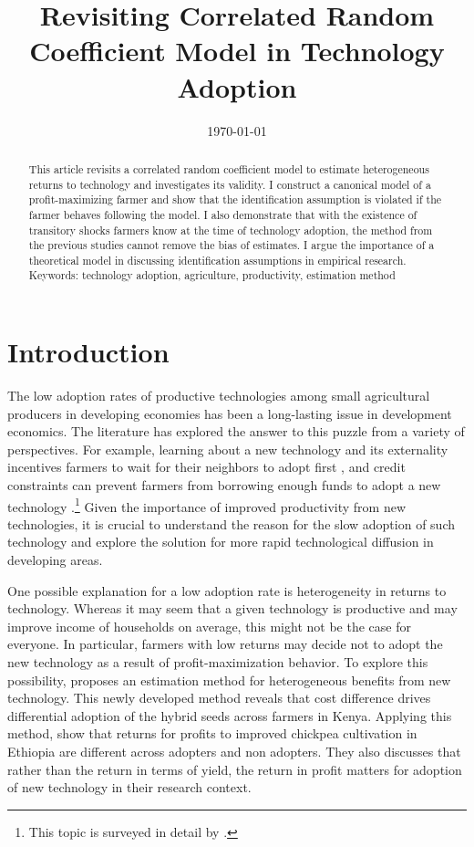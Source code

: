 \documentclass[11pt,letterpaper]{article}
\title{Revisiting Correlated Random Coefficient Model in Technology Adoption}
\author{}
\date{\today}
\begin{document}
  
\maketitle
\begin{abstract}
  \singlespacing
    \noindent 
    This article revisits a correlated random coefficient model to estimate heterogeneous returns to technology and investigates its validity.
    I construct a canonical model of a profit-maximizing farmer and show that the identification assumption is violated if the farmer behaves following the model. 
    I also demonstrate that with the existence of transitory shocks farmers know at the time of technology adoption, the method from the previous studies cannot remove the bias of estimates.
    I argue the importance of a theoretical model in discussing identification assumptions in empirical research. \\

  \medskip
  \noindent Keywords: technology adoption, agriculture, productivity, estimation method
\end{abstract}

\newpage

\section{Introduction}

The low adoption rates of productive technologies among small agricultural producers in developing economies has been a long-lasting issue in development economics. 
The literature has explored the answer to this puzzle from a variety of perspectives.
For example, learning about a new technology and its externality incentives farmers to wait for their neighbors to adopt first \citep{foster1995learning, conley2010learning}, and credit constraints can prevent farmers from borrowing enough funds to adopt a new technology \citep{gine2006credit}.\footnote{
  This topic is surveyed in detail by \citet{foster2010microeconomics}.
}
Given the importance of improved productivity from new technologies, it is crucial to understand the reason for the slow adoption of such technology and explore the solution for more rapid technological diffusion in developing areas.

One possible explanation for a low adoption rate is heterogeneity in returns to technology.
Whereas it may seem that a given technology is productive and may improve income of households on average, this might not be the case for everyone.
In particular, farmers with low returns may decide not to adopt the new technology as a result of profit-maximization behavior.
To explore this possibility, \citet{Suri11} proposes an estimation method for heterogeneous benefits from new technology.
This newly developed method reveals that cost difference drives differential adoption of the hybrid seeds across farmers in Kenya.
Applying this method, \citet{Michler2019} show that returns for profits to improved chickpea cultivation in Ethiopia are different across adopters and non adopters.
They also discusses that rather than the return in terms of yield, the return in profit matters for adoption of new technology in their research context.
\end{document}
